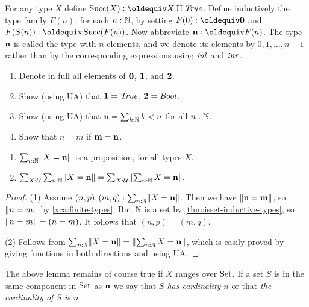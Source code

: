 \begin{definition}\label{def:finiteset}
For any type $X$ define $\Succ(X)\defeq X\amalg\true$.
Define inductively the type family $F(n)$, for each $n:\mathbb{N}$, by
setting $F(0)\defeq\bn{0}$ and $F(S(n))\defeq\Succ(F(n))$.
Now abbreviate $\bn{n}\defeq F(n)$. The type $\mathbf{n}$ is called
the type with $n$ elements, and we denote its elements
by $0,1,\ldots,n-1$ rather than by the corresponding expressions
using $\mathop{{\it inl}_{}}$ and $\mathop{{\it inr}_{}}$.

\begin{xca}\label{xca:finite-types}
\hspace{1in}
  \begin{enumerate}
  \item Denote in full all elements of $\mathbf{0} $, $\mathbf{1} $, and $\mathbf{2}$.
  \item Show (using UA) that $\mathbf{1} =\mathop{\mathit{True}}$, $\mathbf{2} =\mathop{\mathit{Bool}}$.
  \item Show (using UA) that $\mathbf{n} = \sum_{k:\mathbb{N}} k<n$ for all $n:\mathbb{N}$.
  \item Show that $n=m$ if $\mathbf{m}=\mathbf{n}$.
  \end{enumerate}
\end{xca}
  
\begin{lemma}\label{lem:maxonefinitetype}
\hspace{1in}%
\begin{enumerate}
  \item $\sum_{n:\mathbb{N}}\lVert X=\mathbf{n}\rVert$ is a proposition, for all types $X$.
  \item 
$\sum_{X:\mathcal{U}}\sum_{n:\mathbb{N}}\lVert X=\mathbf{n}\rVert =\sum_{X:\mathcal{U}}\lVert\sum_{n:\mathbb{N}}X=\mathbf{n}\rVert.$
  \end{enumerate}
\end{lemma}
\begin{proof}

(1) Assume $(n,p),(m,q): \sum_{n:\mathbb{N}}\lVert X=\mathbf{n}\rVert$.
Then we have $\lVert\mathbf{n}=\mathbf{m}\rVert$, so $\lVert n=m\rVert$
by \cref{xca:finite-types}. But $\mathbb{N}$ is a set by \cref{thm:isset-inductive-types}, 
so $\lVert n=m\rVert=(n=m)$. It follows that $(n,p)=(m,q)$.

(2) Follows from $\sum_{n:\mathbb{N}}\lVert X=\mathbf{n}\rVert =\lVert\sum_{n:\mathbb{N}}X=\mathbf{n}\rVert$,
which is easily proved by giving functions in both directions and using UA.
\end{proof}

The above lemma remains of course true if $X$ ranges over $\mathord{\mathrm{Set}}$.
If a set $S$ is in the same component in $\mathord{\mathrm{Set}}$ as $\mathbf{n}$ we say that \emph{$S$ has cardinality $n$} or that \emph{the cardinality of $S$ is $n$}.


\end{definition}
